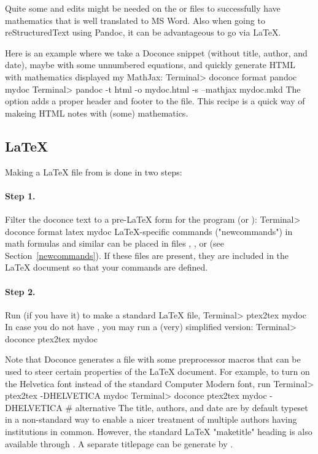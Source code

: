 \documentclass[twoside]{book}
\begin{document}
{{{{Quite some  and  edits might be needed
on the  or  files to successfully have mathematics that is
well translated to MS Word.  Also when going to reStructuredText using
Pandoc, it can be advantageous to go via {\LaTeX}.

Here is an example where we take a Doconce snippet (without title, author,
and date), maybe with some unnumbered equations, and quickly generate
HTML with mathematics displayed my MathJax:
\bsys
Terminal> doconce format pandoc mydoc
Terminal> pandoc -t html -o mydoc.html -s --mathjax mydoc.mkd
\esys
The  option adds a proper header and footer to the  file.
This recipe is a quick way of makeing HTML notes with (some) mathematics.

\subsection{{\LaTeX}}

Making a {\LaTeX} file  from  is done in two steps:

\paragraph{Step 1.}
Filter the doconce text to a pre-LaTeX form  for
the  program (or ):
\bsys
Terminal> doconce format latex mydoc
\esys
LaTeX-specific commands ("newcommands") in math formulas and similar
can be placed in files , , or
 (see Section~\ref{newcommands}).
If these files are present, they are included in the {\LaTeX} document
so that your commands are defined.

\paragraph{Step 2.}
Run  (if you have it) to make a standard {\LaTeX} file,
\bsys
Terminal> ptex2tex mydoc
\esys
In case you do not have , you may run a (very) simplified version:
\bsys
Terminal> doconce ptex2tex mydoc
\esys

Note that Doconce generates a  file with some preprocessor macros
that can be used to steer certain properties of the {\LaTeX} document.
For example, to turn on the Helvetica font instead of the standard
Computer Modern font, run
\bsys
Terminal> ptex2tex -DHELVETICA mydoc
Terminal> doconce ptex2tex mydoc -DHELVETICA  # alternative
\esys
The title, authors, and date are by default typeset in a non-standard
way to enable a nicer treatment of multiple authors having
institutions in common. However, the standard {\LaTeX} "maketitle" heading
is also available through .
A separate titlepage can be generate by
.

}}}}
\end{document}
